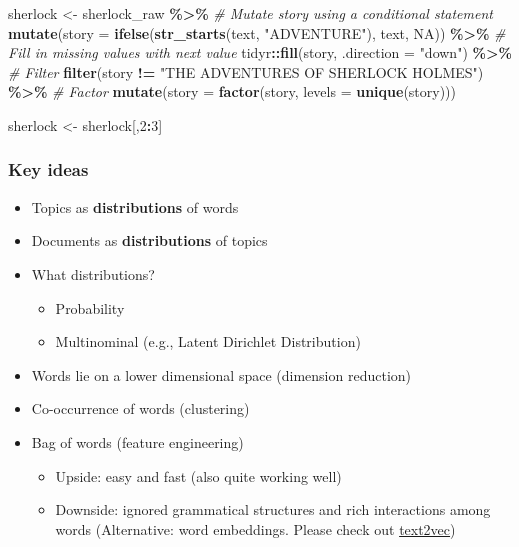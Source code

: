 \documentclass[
]{book}
\newenvironment{Shaded}{\begin{snugshade}}{\end{snugshade}}
\newcommand{\CommentTok}[1]{\textcolor[rgb]{0.56,0.35,0.01}{\textit{#1}}}
\newcommand{\DataTypeTok}[1]{\textcolor[rgb]{0.13,0.29,0.53}{#1}}
\newcommand{\DecValTok}[1]{\textcolor[rgb]{0.00,0.00,0.81}{#1}}
\newcommand{\KeywordTok}[1]{\textcolor[rgb]{0.13,0.29,0.53}{\textbf{#1}}}
\newcommand{\NormalTok}[1]{#1}
\newcommand{\OperatorTok}[1]{\textcolor[rgb]{0.81,0.36,0.00}{\textbf{#1}}}
\newcommand{\OtherTok}[1]{\textcolor[rgb]{0.56,0.35,0.01}{#1}}
\newcommand{\StringTok}[1]{\textcolor[rgb]{0.31,0.60,0.02}{#1}}
\providecommand{\tightlist}{%
  \setlength{\itemsep}{0pt}\setlength{\parskip}{0pt}}
\begin{document}
\begin{Shaded}
\begin{Highlighting}[]
\NormalTok{sherlock \textless{}{-}}\StringTok{ }\NormalTok{sherlock\_raw }\OperatorTok{\%\textgreater{}\%}
\StringTok{  }\CommentTok{\# Mutate story using a conditional statement }
\StringTok{  }\KeywordTok{mutate}\NormalTok{(}\DataTypeTok{story =} \KeywordTok{ifelse}\NormalTok{(}\KeywordTok{str\_starts}\NormalTok{(text, }\StringTok{"ADVENTURE"}\NormalTok{), }
\NormalTok{                                   text, }\OtherTok{NA}\NormalTok{)) }\OperatorTok{\%\textgreater{}\%}
\StringTok{  }\CommentTok{\# Fill in missing values with next value  }
\StringTok{  }\NormalTok{tidyr}\OperatorTok{::}\KeywordTok{fill}\NormalTok{(story, }\DataTypeTok{.direction =} \StringTok{"down"}\NormalTok{) }\OperatorTok{\%\textgreater{}\%}
\StringTok{  }\CommentTok{\# Filter }
\StringTok{  }\KeywordTok{filter}\NormalTok{(story }\OperatorTok{!=}\StringTok{ "THE ADVENTURES OF SHERLOCK HOLMES"}\NormalTok{) }\OperatorTok{\%\textgreater{}\%}
\StringTok{  }\CommentTok{\# Factor }
\StringTok{  }\KeywordTok{mutate}\NormalTok{(}\DataTypeTok{story =} \KeywordTok{factor}\NormalTok{(story, }\DataTypeTok{levels =} \KeywordTok{unique}\NormalTok{(story)))}

\NormalTok{sherlock \textless{}{-}}\StringTok{ }\NormalTok{sherlock[,}\DecValTok{2}\OperatorTok{:}\DecValTok{3}\NormalTok{]}
\end{Highlighting}
\end{Shaded}

\hypertarget{key-ideas}{%
\subsubsection{Key ideas}\label{key-ideas}}

\begin{itemize}
\item
  Topics as \textbf{distributions} of words
\item
  Documents as \textbf{distributions} of topics
\item
  What distributions?

  \begin{itemize}
  \item
    Probability
  \item
    Multinominal (e.g., Latent Dirichlet Distribution)
  \end{itemize}
\item
  Words lie on a lower dimensional space (dimension reduction)
\item
  Co-occurrence of words (clustering)
\item
  Bag of words (feature engineering)

  \begin{itemize}
  \tightlist
  \item
    Upside: easy and fast (also quite working well)
  \item
    Downside: ignored grammatical structures and rich interactions among words (Alternative: word embeddings. Please check out \href{http://text2vec.org/}{text2vec})
  \end{itemize}
\end{itemize}
\end{document}
